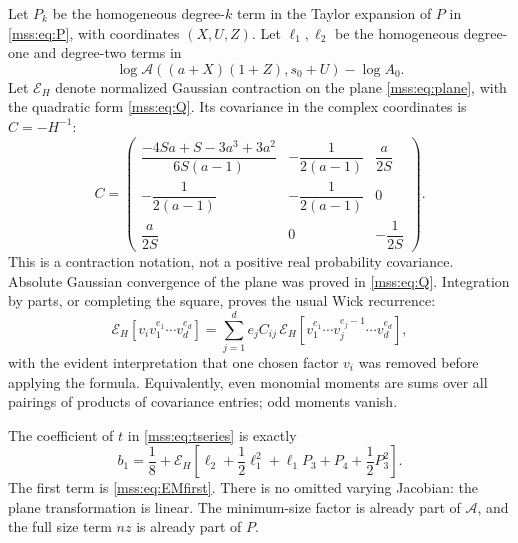 \documentclass[11pt,letterpaper]{article}
\numberwithin{equation}{section}
\theoremstyle{definition}\newtheorem{definition}[theorem]{Definition}
\theoremstyle{remark}\newtheorem{remark}[theorem]{Remark}
\begin{document}
Let $P_k$ be the homogeneous degree-$k$ term in the Taylor expansion of $P$ in \eqref{mss:eq:P}, with coordinates $(X,U,Z)$. Let $\ell_1,\ell_2$ be the homogeneous degree-one and degree-two terms in
\begin{equation}\label{mss:eq:ell}
\log\mathcal A((a+X)(1+Z),s_0+U)-\log A_0.
\end{equation}
Let $\mathcal E_H$ denote normalized Gaussian contraction on the plane \eqref{mss:eq:plane}, with the quadratic form \eqref{mss:eq:Q}. Its covariance in the complex coordinates is $C=-H^{-1}$:
\begin{equation}\label{mss:eq:C}
C=\begin{pmatrix}
\dfrac{-4Sa+S-3a^3+3a^2}{6S(a-1)}&-\dfrac1{2(a-1)}&\dfrac a{2S}\\[6pt]
-\dfrac1{2(a-1)}&-\dfrac1{2(a-1)}&0\\[6pt]
\dfrac a{2S}&0&-\dfrac1{2S}
\end{pmatrix}.
\end{equation}
This is a contraction notation, not a positive real probability covariance. Absolute Gaussian convergence of the plane was proved in \eqref{mss:eq:Q}. Integration by parts, or completing the square, proves the usual Wick recurrence:
\begin{equation}\label{mss:eq:wick}
\mathcal E_H[v_i v_1^{e_1}\cdots v_d^{e_d}]
=\sum_{j=1}^{d}e_j C_{ij}\,
\mathcal E_H[v_1^{e_1}\cdots v_j^{e_j-1}\cdots v_d^{e_d}],
\end{equation}
with the evident interpretation that one chosen factor $v_i$ was removed before applying the formula. Equivalently, even monomial moments are sums over all pairings of products of covariance entries; odd moments vanish.

The coefficient of $t$ in \eqref{mss:eq:tseries} is exactly
\begin{equation}\label{mss:eq:b1contract}
b_1=\frac18+
\mathcal E_H\left[\ell_2+\frac12\ell_1^2+\ell_1P_3+P_4+\frac12P_3^2\right].
\end{equation}
The first term is \eqref{mss:eq:EMfirst}. There is no omitted varying Jacobian: the plane transformation is linear. The minimum-size factor is already part of $\mathcal A$, and the full size term $nz$ is already part of $P$.
\end{document}

